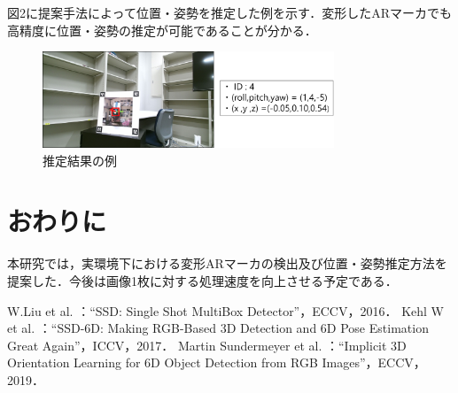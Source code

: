 \documentclass[a4j,twocolumn,10pt]{jarticle}
\begin{document}
図2に提案手法によって位置・姿勢を推定した例を示す．変形したARマーカでも高精度に位置・姿勢の推定が可能であることが分かる．

\renewcommand{\arraystretch}{1.0}
\begin{figure}[h]
\vspace{-1zh}
\centering
\includegraphics[width=87mm]{./画像/推定結果.eps}
\caption{推定結果の例}
\label{fig:graph3}
\vspace{-2zh}
\end{figure}



\section{おわりに}
本研究では，実環境下における変形ARマーカの検出及び位置・姿勢推定方法を提案した．今後は画像1枚に対する処理速度を向上させる予定である．



\begin{thebibliography}{1}

{\scriptsize {} W.Liu et al.                     ：“SSD: Single Shot MultiBox Detector”，ECCV，2016．}
{\scriptsize {} Kehl W et al.                   ：“SSD-6D: Making RGB-Based 3D Detection and 6D Pose Estimation Great Again”，ICCV，2017．}
{\scriptsize {} Martin Sundermeyer et al. ：“Implicit 3D Orientation Learning for 6D Object Detection from RGB Images”，ECCV，2019．}

\end{thebibliography}
\end{document}
